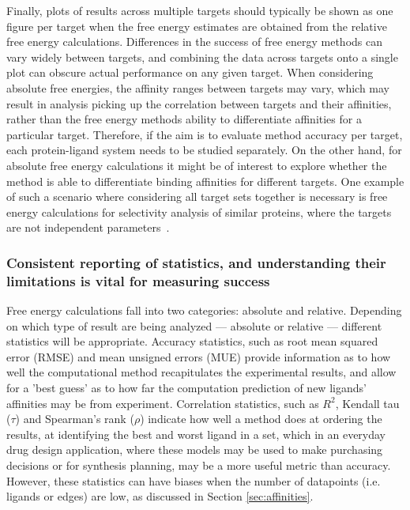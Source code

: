\documentclass[9pt,bestpractices]{livecoms}
\begin{document}
Finally, plots of results across multiple targets should typically be shown as one figure per target when the free energy estimates are obtained from the relative free energy calculations. Differences in the success of free energy methods can vary widely between targets, and combining the data across targets onto a single plot can obscure actual performance on any given target. When considering absolute free energies, the affinity ranges between targets may vary, which may result in analysis picking up the correlation between targets and their affinities, rather than the free energy methods ability to differentiate affinities for a particular target. Therefore, if the aim is to evaluate method accuracy per target, each protein-ligand system needs to be studied separately. On the other hand, for absolute free energy calculations it might be of interest to explore whether the method is able to differentiate binding affinities for different targets. One example of such a scenario where considering all target sets together is necessary is free energy calculations for selectivity analysis of similar proteins, where the targets are not independent parameters~\cite{aldeghiPredictionsLigandSelectivity2017}.

\subsubsection{Consistent reporting of statistics, and understanding their limitations is vital for measuring success}
\label{sec:statistical_analysis}
Free energy calculations fall into two categories: absolute and relative. Depending on which type of result are being analyzed --- absolute or relative --- different statistics will be appropriate. Accuracy statistics, such as root mean squared error (RMSE) and mean unsigned errors (MUE) provide information as to how well the computational method recapitulates the experimental results, and allow for a 'best guess' as to how far the computation prediction of new ligands' affinities may be from experiment. Correlation statistics, such as $R^{2}$, Kendall tau ($\tau$) and Spearman's rank ($\rho$) indicate how well a method does at ordering the results, at identifying the best and worst ligand in a set, which in an everyday drug design application, where these models may be used to make purchasing decisions or for synthesis planning, may be a more useful metric than accuracy. However, these statistics can have biases when the number of datapoints (i.e. ligands or edges) are low, as discussed in Section \ref{sec:affinities}.
\end{document}
